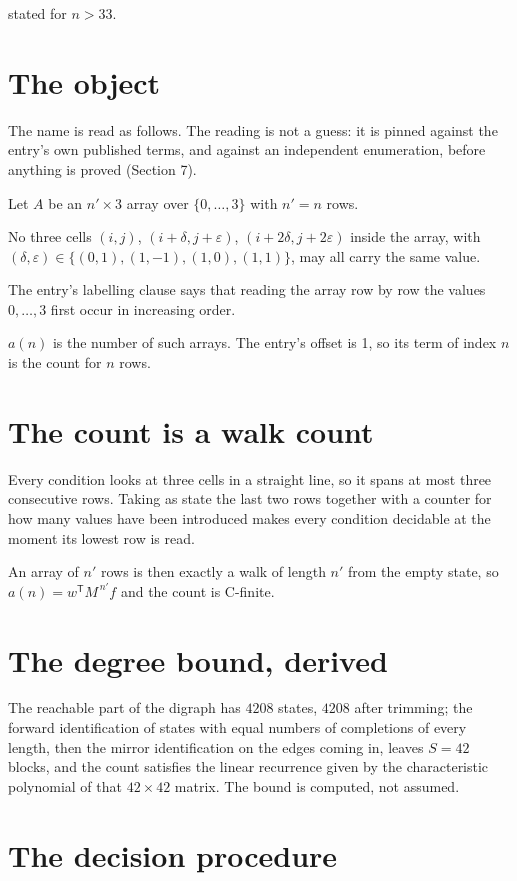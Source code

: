 \documentclass[11pt]{article}
\theoremstyle{definition}
\begin{document}
stated for $n > 33$.

\section{The object}

The name is read as follows. The reading is not a guess: it is pinned against the entry's own published terms, and against an independent enumeration, before anything is proved (Section 7).

Let $A$ be an $n' \times 3$ array over $\{0,\dots,3\}$ with $n' = n$ rows.

No three cells $(i,j)$, $(i{+}\delta,j{+}\varepsilon)$, $(i{+}2\delta,j{+}2\varepsilon)$ inside the array, with $(\delta,\varepsilon) \in \{(0,1), (1,-1), (1,0), (1,1)\}$, may all carry the same value.

The entry's labelling clause says that reading the array row by row the values $0,\dots,3$ first occur in increasing order.

$a(n)$ is the number of such arrays. The entry's offset is 1, so its term of index $n$ is the count for $n$ rows.

\section{The count is a walk count}

Every condition looks at three cells in a straight line, so it spans at most three consecutive rows. Taking as state the last two rows together with a counter for how many values have been introduced makes every condition decidable at the moment its lowest row is read.

An array of $n'$ rows is then exactly a walk of length $n'$ from the empty state, so $a(n) = w^{\mathsf T}M^{\,n'}f$ and the count is C-finite.

\section{The degree bound, derived}

The reachable part of the digraph has $4208$ states, $4208$ after trimming; the forward identification of states with equal numbers of completions of every length, then the mirror identification on the edges coming in, leaves $S = 42$ blocks, and the count satisfies the linear recurrence given by the characteristic polynomial of that $42\times42$ matrix. The bound is computed, not assumed.

\section{The decision procedure}
\end{document}
